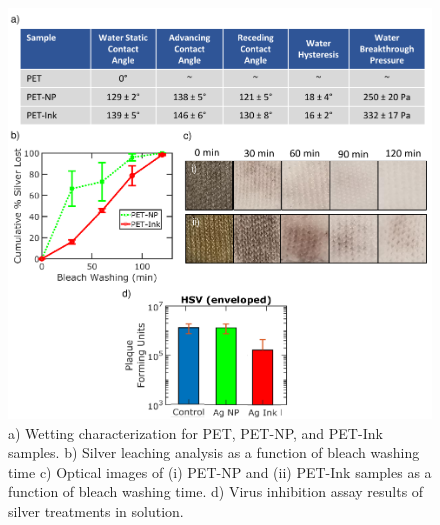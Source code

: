 \documentclass[journal=jacsat,manuscript=article]{achemso}
\begin{document}
\begin{figure}[H]
       \centering
    \includegraphics[width= \linewidth]{Figures/fig_wash1.pdf}
\caption[Durability]{
a) Wetting characterization for PET, PET-NP, and PET-Ink samples. b) Silver leaching analysis as a function of bleach washing time c) Optical images of (i) PET-NP and (ii) PET-Ink samples as a function of bleach washing time. d) Virus inhibition assay results of silver treatments in solution.} %

\label{fig:durable}
\end{figure}
\end{document}
